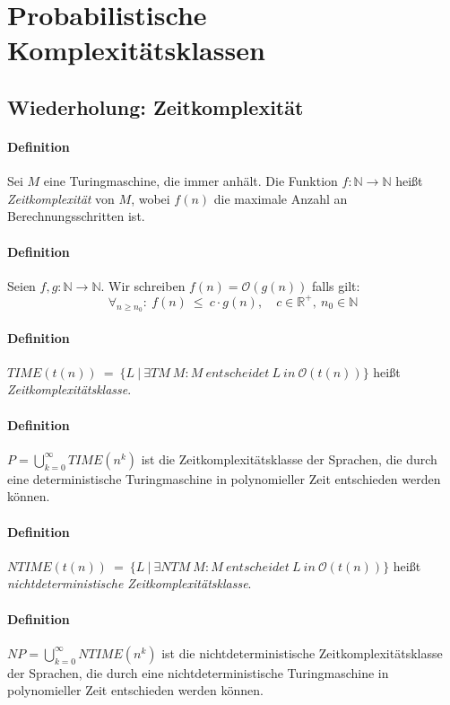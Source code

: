 \section{Probabilistische Komplexitätsklassen}


\subsection{Wiederholung: Zeitkomplexität}

\paragraph{Definition}
Sei $M$ eine Turingmaschine, die immer anhält.
Die Funktion $f:\mathbb{N}\to\mathbb{N}$ heißt \emph{Zeitkomplexität} von $M$, wobei $f(n)$ die maximale Anzahl an Berechnungsschritten ist.

\paragraph{Definition}
Seien $f,g:\mathbb{N}\to\mathbb{N}$.
Wir schreiben $f(n) = \mathcal{O}(g(n))$ falls gilt:
\begin{equation*}
	\forall_{n \geq n_0}:\ f(n)\ \leq \ c \cdot g(n), \quad c \in \mathbb{R}^+,\ n_0 \in \mathbb{N}
\end{equation*}

\paragraph{Definition}
$TIME(t(n))\ =\ \bigl\{L\ \bigl\vert\ \exists TM\ M : M\ entscheidet\ L\ in\ \mathcal{O}(t(n)) \bigl\}$ heißt \emph{Zeitkomplexitätsklasse}.

\paragraph{Definition}
$P = \bigcup\limits_{k=0}^{\infty} TIME(n^k)$ ist die Zeitkomplexitätsklasse der Sprachen, die durch eine deterministische Turingmaschine in polynomieller Zeit entschieden werden können.

\paragraph{Definition}
$NTIME(t(n))\ =\ \bigl\{L\ \bigl\vert\ \exists NTM\ M : M\ entscheidet\ L\ in\ \mathcal{O}(t(n)) \bigl\}$ heißt \emph{nichtdeterministische Zeitkomplexitätsklasse}.

\paragraph{Definition}
$NP = \bigcup\limits_{k=0}^{\infty} NTIME(n^k)$ ist die nichtdeterministische Zeitkomplexitätsklasse der Sprachen, die durch eine nichtdeterministische Turingmaschine in polynomieller Zeit entschieden werden können.


